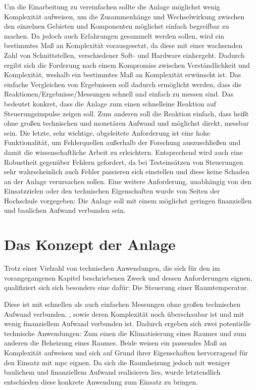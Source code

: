 Um die Einarbeitung zu vereinfachen sollte die Anlage möglichst wenig Komplexität aufweisen, um die Zusammenhänge und Wechselwirkung zwischen den einzelnen Gebieten und Komponenten möglichst einfach begreifbar zu machen. Da jedoch auch Erfahrungen gesammelt werden sollen, wird ein bestimmtes Maß an Komplexität vorausgesetzt, da diese mit einer wachsenden Zahl von Schnittstellen, verschiedener Soft- und Hardware einhergeht. Dadurch ergibt sich die Forderung nach einem Kompromiss zwischen Verständlichkeit und Komplexität, weshalb ein bestimmtes Maß an Komplexität erwünscht ist.
Das einfache Vergleichen von Ergebnissen soll dadurch ermöglicht werden, dass die Reaktionen/Ergebnisse/Messungen schnell und einfach zu messen sind. Das bedeutet konkret, dass die Anlage zum einen \Gun schnell\Gob eine Reaktion auf Steuerungsimpulse zeigen soll. Zum anderen soll die Reaktion einfach, dass heißt ohne großen technischen und monetären Aufwand und möglichst direkt, messbar sein. Die letzte, sehr wichtige, abgeleitete Anforderung ist eine hohe Funktionalität, um Fehlerquellen außerhalb der Forschung auszuschließen und damit die wissenschaftliche Arbeit zu erleichtern. Entsprechend wird auch eine Robustheit gegenüber Fehlern gefordert, da bei Testeinsätzen von Steuerungen sehr wahrscheinlich auch Fehler passieren sich einstellen und diese keine Schaden an der Anlage verursachen sollen.
Eine weitere Anforderung, unabhängig von den Einsatzzielen oder den technischen Eigenschaften wurde von Seiten der Hochschule vorgegeben: Die Anlage soll mit einem möglichst geringen finanziellen und baulichen Aufwand verbunden sein.



\section{Das Konzept der Anlage}

Trotz einer Vielzahl von technischen Anwendungen, die sich für den im vorangegangenen Kapitel beschriebenen Zweck und dessen Anforderungen eignen, qualifiziert sich  sich besonders eine dafür: Die Steuerung einer Raumtemperatur.

Diese ist mit schnellen als auch einfachen Messungen ohne großen technischen Aufwand verbunden.
, sowie deren Komplexität noch überschaubar ist und mit wenig finanziellem Aufwand verbunden ist. Dadurch ergeben sich zwei potentielle technische Anwendungen: Zum einen die Klimatisierung eines Raumes und zum anderen die Beheizung eines Raumes. Beide weisen ein passendes Maß an Komplexität aufweisen und sich auf Grund ihrer Eigenschaften hervorragend für den Einsatz mit \acrlong{mpc} eignen. Da sich die Raumheizung jedoch mit weniger baulichem und finanziellem Aufwand realisieren lies, wurde letztendlich entschieden diese konkrete Anwendung zum Einsatz zu bringen.


